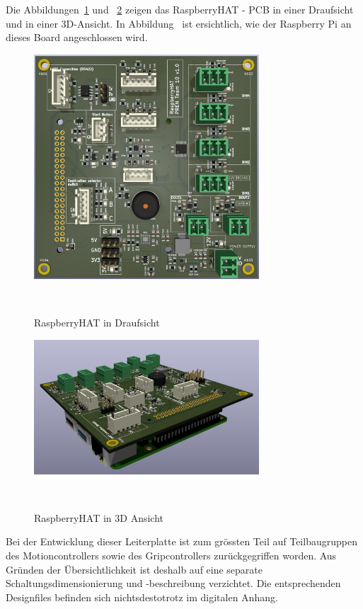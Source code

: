 \documentclass[main.tex]{subfiles} %
\begin{document}
Die Abbildungen~\ref{fig:RaspberryHAT_draufsicht} und
~\ref{fig:RaspberryHAT_3D} zeigen das RaspberryHAT - PCB in einer Draufsicht
und in einer 3D-Ansicht. In Abbildung~\label{fig:RaspberryHAT_3D} ist
ersichtlich, wie der Raspberry Pi an dieses Board angeschlossen wird.

\begin{figure}[H]
      \centering
      \includegraphics[width=0.75\textwidth]{./fig_RaspberryHAT/RaspberryHAT_draufsicht.png}
      \caption{RaspberryHAT in Draufsicht}~\label{fig:RaspberryHAT_draufsicht}
\end{figure}

\begin{figure}[H]
      \centering
      \includegraphics[width=0.75\textwidth]{./fig_RaspberryHAT/RaspberryHAT_3D.png}
      \caption{RaspberryHAT in 3D Ansicht}~\label{fig:RaspberryHAT_3D}
\end{figure}

Bei der Entwicklung dieser Leiterplatte ist zum grössten Teil auf
Teilbaugruppen des Motioncontrollers sowie des Gripcontrollers zurückgegriffen
worden. Aus Gründen der Übersichtlichkeit ist deshalb auf eine separate
Schaltungsdimensionierung und -beschreibung verzichtet. Die entsprechenden
Designfiles befinden sich nichtsdestotrotz im digitalen Anhang.
\end{document}
